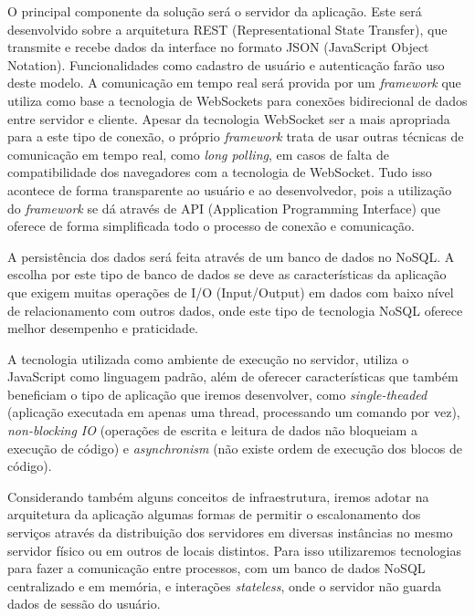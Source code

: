 O principal componente da solução será o servidor da aplicação. Este será desenvolvido sobre a arquitetura REST (Representational State Transfer), que transmite e recebe dados da interface no formato JSON (JavaScript Object Notation). Funcionalidades como cadastro de usuário e autenticação farão uso deste modelo. A comunicação em tempo real será provida por um \textit{framework} que utiliza como base a tecnologia de WebSockets para conexões bidirecional de dados entre servidor e cliente. Apesar da tecnologia WebSocket ser a mais apropriada para a este tipo de conexão, o próprio \textit{framework} trata de usar outras técnicas de comunicação em tempo real, como \textit{long polling}, em casos de falta de compatibilidade dos navegadores com a tecnologia de WebSocket. Tudo isso acontece de forma transparente ao usuário e ao desenvolvedor, pois a utilização do \textit{framework} se dá através de API (Application Programming Interface) que oferece de forma simplificada todo o processo de conexão e comunicação.

A persistência dos dados será feita através de um banco de dados no NoSQL. A escolha por este tipo de banco de dados se deve as características da aplicação que exigem muitas operações de I/O (Input/Output) em dados com baixo nível de relacionamento com outros dados, onde este tipo de tecnologia NoSQL oferece melhor desempenho e praticidade.

A tecnologia utilizada como ambiente de execução no servidor, utiliza o JavaScript como linguagem padrão, além de oferecer características que também beneficiam o tipo de aplicação que iremos desenvolver, como \textit{single-theaded} (aplicação executada em apenas uma thread, processando um comando por vez), \textit{non-blocking IO} (operações de escrita e leitura de dados não bloqueiam a execução de código) e \textit{asynchronism} (não existe ordem de execução dos blocos de código). 

Considerando também alguns conceitos de infraestrutura, iremos adotar na arquitetura da aplicação algumas formas de permitir o escalonamento dos serviços através da distribuição dos servidores em diversas instâncias no mesmo servidor físico ou em outros de locais distintos. Para isso utilizaremos tecnologias para fazer a comunicação entre processos, com um banco de dados NoSQL centralizado e em memória, e interações \textit{stateless}, onde o servidor não guarda dados de sessão do usuário.